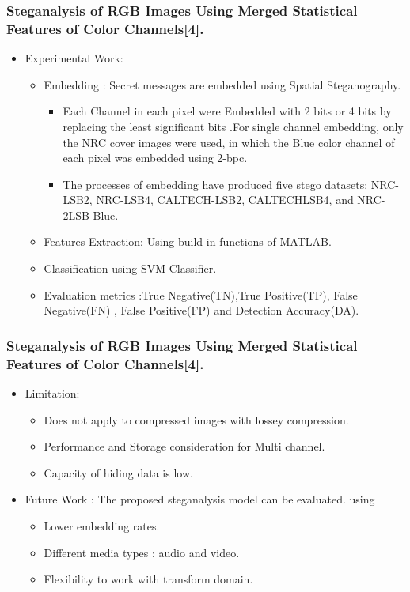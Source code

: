 \documentclass{beamer} %
\theoremstyle{definition} %
\begin{document}
\begin{frame}
\frametitle{Steganalysis of RGB Images Using Merged Statistical Features of Color Channels[4].}
\begin{itemize}
\item Experimental Work:
 \begin{itemize}
 	 	\item Embedding : Secret messages are embedded using Spatial Steganography.
 	\begin{itemize}
 	\item Each Channel in each pixel were Embedded with 2 bits or 4 bits by replacing the least significant bits .For single channel embedding, only the NRC cover images were used, in which the Blue color channel of each pixel was embedded using 2-bpc.
 	\item  The processes of embedding have produced five stego datasets: NRC-LSB2, NRC-LSB4, CALTECH-LSB2, CALTECHLSB4, and NRC-2LSB-Blue.  
 \end{itemize}
      \item Features Extraction: Using build in functions of MATLAB. 
      \item Classification using SVM Classifier.
      \item Evaluation metrics :True Negative(TN),True Positive(TP), False Negative(FN) , False Positive(FP) and Detection Accuracy(DA).  
\end{itemize}
\end{itemize}
\end{frame}

\begin{frame}
\frametitle{Steganalysis of RGB Images Using Merged Statistical Features of Color Channels[4]. }
\begin{itemize}
\item Limitation: 
 \begin{itemize}
 	\item Does not apply to compressed images with lossey compression.
 	\item Performance and Storage consideration for Multi channel.
 	\item Capacity of hiding data is low.
 \end{itemize}
 \item Future Work : The proposed steganalysis model can be evaluated. using 
 \begin{itemize}
 	\item Lower embedding rates. 
 	\item Different media types : audio and video.  
 	\item Flexibility to work with transform domain.  
 \end{itemize}
 \end{itemize}
\end{frame}
\end{document}
